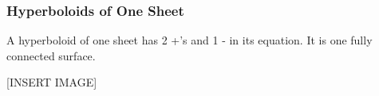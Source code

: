 \subsubsection{Hyperboloids of One Sheet}
\noindent
A hyperboloid of one sheet has 2 +'s and 1 - in its equation. It is one fully connected surface.

[INSERT IMAGE]
